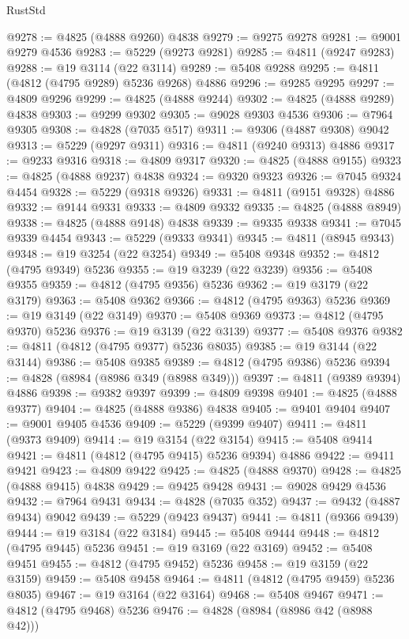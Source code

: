 \begin{lexlean}{RustStd}
\begin{coremodule}
@9278 := @4825 (@4888 @9260) @4838
@9279 := @9275 @9278
@9281 := @9001 @9279 @4536
@9283 := @5229 (@9273 @9281)
@9285 := @4811 (@9247 @9283)
@9288 := @19 @3114 (@22 @3114)
@9289 := @5408 @9288
@9295 := @4811 (@4812 (@4795 @9289) @5236 @9268) @4886
@9296 := @9285 @9295
@9297 := @4809 @9296
@9299 := @4825 (@4888 @9244)
@9302 := @4825 (@4888 @9289) @4838
@9303 := @9299 @9302
@9305 := @9028 @9303 @4536
@9306 := @7964 @9305
@9308 := @4828 (@7035 @517)
@9311 := @9306 (@4887 @9308) @9042
@9313 := @5229 (@9297 @9311)
@9316 := @4811 (@9240 @9313) @4886
@9317 := @9233 @9316
@9318 := @4809 @9317
@9320 := @4825 (@4888 @9155)
@9323 := @4825 (@4888 @9237) @4838
@9324 := @9320 @9323
@9326 := @7045 @9324 @4454
@9328 := @5229 (@9318 @9326)
@9331 := @4811 (@9151 @9328) @4886
@9332 := @9144 @9331
@9333 := @4809 @9332
@9335 := @4825 (@4888 @8949)
@9338 := @4825 (@4888 @9148) @4838
@9339 := @9335 @9338
@9341 := @7045 @9339 @4454
@9343 := @5229 (@9333 @9341)
@9345 := @4811 (@8945 @9343)
@9348 := @19 @3254 (@22 @3254)
@9349 := @5408 @9348
@9352 := @4812 (@4795 @9349) @5236
@9355 := @19 @3239 (@22 @3239)
@9356 := @5408 @9355
@9359 := @4812 (@4795 @9356) @5236
@9362 := @19 @3179 (@22 @3179)
@9363 := @5408 @9362
@9366 := @4812 (@4795 @9363) @5236
@9369 := @19 @3149 (@22 @3149)
@9370 := @5408 @9369
@9373 := @4812 (@4795 @9370) @5236
@9376 := @19 @3139 (@22 @3139)
@9377 := @5408 @9376
@9382 := @4811 (@4812 (@4795 @9377) @5236 @8035)
@9385 := @19 @3144 (@22 @3144)
@9386 := @5408 @9385
@9389 := @4812 (@4795 @9386) @5236
@9394 := @4828 (@8984 (@8986 @349 (@8988 @349)))
@9397 := @4811 (@9389 @9394) @4886
@9398 := @9382 @9397
@9399 := @4809 @9398
@9401 := @4825 (@4888 @9377)
@9404 := @4825 (@4888 @9386) @4838
@9405 := @9401 @9404
@9407 := @9001 @9405 @4536
@9409 := @5229 (@9399 @9407)
@9411 := @4811 (@9373 @9409)
@9414 := @19 @3154 (@22 @3154)
@9415 := @5408 @9414
@9421 := @4811 (@4812 (@4795 @9415) @5236 @9394) @4886
@9422 := @9411 @9421
@9423 := @4809 @9422
@9425 := @4825 (@4888 @9370)
@9428 := @4825 (@4888 @9415) @4838
@9429 := @9425 @9428
@9431 := @9028 @9429 @4536
@9432 := @7964 @9431
@9434 := @4828 (@7035 @352)
@9437 := @9432 (@4887 @9434) @9042
@9439 := @5229 (@9423 @9437)
@9441 := @4811 (@9366 @9439)
@9444 := @19 @3184 (@22 @3184)
@9445 := @5408 @9444
@9448 := @4812 (@4795 @9445) @5236
@9451 := @19 @3169 (@22 @3169)
@9452 := @5408 @9451
@9455 := @4812 (@4795 @9452) @5236
@9458 := @19 @3159 (@22 @3159)
@9459 := @5408 @9458
@9464 := @4811 (@4812 (@4795 @9459) @5236 @8035)
@9467 := @19 @3164 (@22 @3164)
@9468 := @5408 @9467
@9471 := @4812 (@4795 @9468) @5236
@9476 := @4828 (@8984 (@8986 @42 (@8988 @42)))

\end{coremodule}
\end{lexlean}
